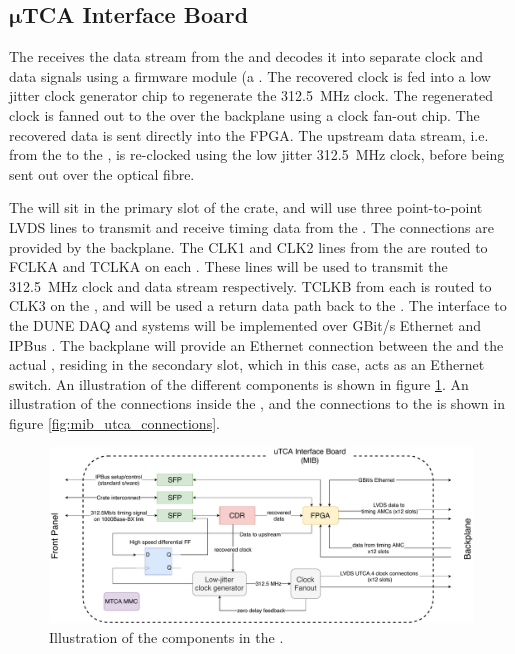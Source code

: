 \documentclass{dune}
\begin{document}
\subsection[$\mu$TCA Interface Board]{$\boldsymbol{\mu}$TCA Interface Board}
The  receives the  data stream from the  and decodes it into separate clock and data signals using a firmware  module (a  . The recovered clock is fed into a low jitter clock generator chip to regenerate the \SI{312.5}{\MHz} clock. The regenerated clock is fanned out to the  over the  backplane using a clock fan-out chip. The recovered data is sent directly into the  FPGA. The upstream data stream, i.e. from the  to the , is re-clocked using the low jitter \SI{312.5}{\MHz} clock, before being sent out over the optical fibre.

The  will sit in the primary  slot of the  crate, and will use three point-to-point LVDS lines to transmit and receive timing data from the . The connections are provided by the  backplane. The CLK1 and CLK2 lines from the  are routed to FCLKA and TCLKA on each . These lines will be used to transmit the \SI{312.5}{\MHz} clock and  data stream respectively. TCLKB from each  is routed to CLK3 on the , and will be used a return data path back to the . The interface to the DUNE DAQ and  systems will be implemented over GBit/s Ethernet and IPBus \cite{ipbus}. The  backplane will provide an Ethernet connection between the  and the actual , residing in the secondary  slot, which in this case, acts as an Ethernet switch. An illustration of the different  components is shown in figure \ref{fig:mib_layout}. An illustration of the connections inside the , and the connections to the  is shown in figure \ref{fig:mib_utca_connections}.

\begin{figure}[h]
\includegraphics[width=\textwidth]{mib_block_diagram.pdf}
\caption{Illustration of the components in the .}
\label{fig:mib_layout}
\end{figure}
\end{document}
